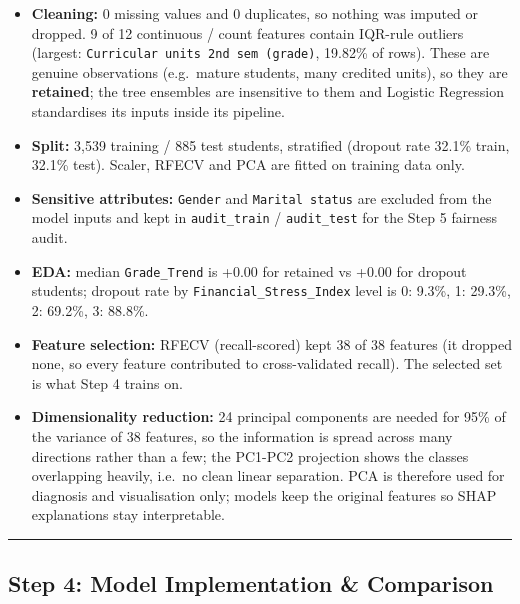 \documentclass[11pt]{article}
\providecommand{\tightlist}{%
      \setlength{\itemsep}{0pt}\setlength{\parskip}{0pt}}
\begin{document}
\begin{itemize}
\tightlist
\item
  \textbf{Cleaning:} 0 missing values and 0 duplicates, so nothing was
  imputed or dropped. 9 of 12 continuous / count features contain
  IQR-rule outliers (largest:
  \texttt{Curricular\ units\ 2nd\ sem\ (grade)}, 19.82\% of rows). These
  are genuine observations (e.g.~mature students, many credited units),
  so they are \textbf{retained}; the tree ensembles are insensitive to
  them and Logistic Regression standardises its inputs inside its
  pipeline.
\item
  \textbf{Split:} 3,539 training / 885 test students, stratified
  (dropout rate 32.1\% train, 32.1\% test). Scaler, RFECV and PCA are
  fitted on training data only.
\item
  \textbf{Sensitive attributes:} \texttt{Gender} and
  \texttt{Marital\ status} are excluded from the model inputs and kept
  in \texttt{audit\_train} / \texttt{audit\_test} for the Step 5
  fairness audit.
\item
  \textbf{EDA:} median \texttt{Grade\_Trend} is +0.00 for retained vs
  +0.00 for dropout students; dropout rate by
  \texttt{Financial\_Stress\_Index} level is 0: 9.3\%, 1: 29.3\%, 2:
  69.2\%, 3: 88.8\%.
\item
  \textbf{Feature selection:} RFECV (recall-scored) kept 38 of 38
  features (it dropped none, so every feature contributed to
  cross-validated recall). The selected set is what Step 4 trains on.
\item
  \textbf{Dimensionality reduction:} 24 principal components are needed
  for 95\% of the variance of 38 features, so the information is spread
  across many directions rather than a few; the PC1-PC2 projection shows
  the classes overlapping heavily, i.e.~no clean linear separation. PCA
  is therefore used for diagnosis and visualisation only; models keep
  the original features so SHAP explanations stay interpretable.
\end{itemize}

    
    \begin{center}\rule{0.5\linewidth}{0.5pt}\end{center}

\hypertarget{step-4-model-implementation-comparison}{%
\subsection{Step 4: Model Implementation \&
Comparison}\label{step-4-model-implementation-comparison}}
\end{document}
